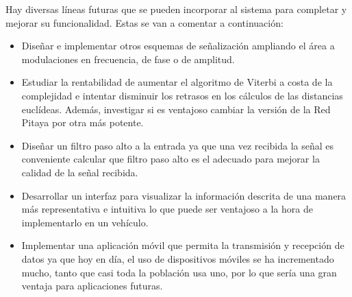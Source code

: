 \newpage
Hay diversas líneas futuras que se pueden incorporar al sistema para completar 
y mejorar su funcionalidad. Estas se van a comentar a continuación:

\begin{itemize}
    \item Diseñar e implementar otros esquemas de señalización ampliando el área a 
    modulaciones en frecuencia, de fase o de amplitud.
    \item Estudiar la rentabilidad de aumentar el algoritmo de Viterbi a costa de la 
    complejidad e intentar disminuir los retrasos en los cálculos de las distancias 
    euclídeas. Además, investigar si es ventajoso cambiar la versión de la Red Pitaya por 
    otra más potente.
    \item Diseñar un filtro paso alto a la entrada
    ya que una vez recibida la señal es conveniente
    calcular que filtro paso alto es el adecuado para mejorar la calidad de
    la señal recibida.
    \item Desarrollar un interfaz para visualizar la información descrita de una manera
    más representativa e intuitiva lo que puede ser ventajoso a la hora de implementarlo
    en un vehículo.
    \item Implementar una aplicación móvil que permita la transmisión y recepción de datos
    ya que hoy en día, el uso de dispositivos móviles se ha incrementado mucho, 
    tanto que casi toda la población usa uno, por lo que sería una gran ventaja para 
    aplicaciones futuras.
\end{itemize}

\chapterend
